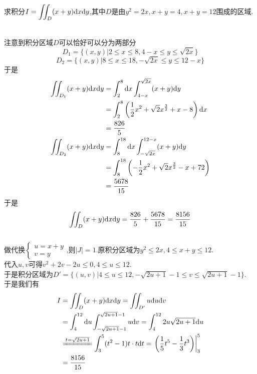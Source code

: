 \documentclass{ctexart}
\begin{document}
\begin{problem}[4.]
    求积分$\displaystyle I=\iint_{D}(x+y)\mathrm{d} x\mathrm{d} y$,其中$D$是由$y^2=2x,x+y=4,x+y=12$围成的区域.
\end{problem}
\begin{solution}
    \\
    注意到积分区域$D$可以恰好可以分为两部分
    \[D_1=\{(x,y)|2\leqslant x\leqslant8,4-x\leqslant y\leqslant\sqrt{2x}\}\]
    \[D_2=\{(x,y)|8\leqslant x\leqslant18,-\sqrt{2x}\leqslant y\leqslant 12-x\}\]
    于是
    \[\begin{aligned}
        \iint_{D_1}(x+y)\mathrm{d} x\mathrm{d} y
        &= \int_2^8\mathrm{d} x\int_{4-x}^{\sqrt{2x}}(x+y)\mathrm{d} y \\
        &= \int_2^8\left(\dfrac12x^2+\sqrt{2}x^{\frac32}+x-8\right)\mathrm{d} x \\
        &= \dfrac{826}{5}\\
        \iint_{D_2}(x+y)\mathrm{d} x\mathrm{d} y
        &= \int_8^{18}\mathrm{d} x\int_{-\sqrt{2x}}^{12-x}(x+y)\mathrm{d} y \\
        &= \int_8^{18}\left(-\dfrac12x^2+\sqrt2x^{\frac32}-x+72\right) \\
        &= \dfrac{5678}{15}
    \end{aligned}\]
    于是
    \[\iint_D(x+y)\mathrm{d} x\mathrm{d} y=\dfrac{826}{5}+\dfrac{5678}{15}=\dfrac{8156}{15}\]
    \\
    做代换$\left\{\begin{array}{l}
        u=x+y\\v=y
    \end{array}\right.$,则$|J|=1$.原积分区域为$y^2\leqslant2x,4\leqslant x+y\leqslant12$.\\
    代入$u,v$可得$v^2+2v-2u\leqslant0,4\leqslant u\leqslant12$.\\
    于是积分区域为$D'=\{(u,v)|4\leqslant u\leqslant12,-\sqrt{2u+1}-1\leqslant v\leqslant\sqrt{2u+1}-1\}$.\\
    于是我们有
    \[\begin{aligned}
        I
        &= \iint_D(x+y)\di x\di y = \iint_{D'}u\di u\di v \\
        &= \int_4^{12}\di u\int_{-\sqrt{2u+1}-1}^{\sqrt{2u+1}-1}u\di v = \int_{4}^{12}2u\sqrt{2u+1}\di u \\
        &\xlongequal{t=\sqrt{2u+1}}\int_3^5(t^2-1)t\cdot t\di t = \left.\left(\dfrac{1}{5}t^5-\dfrac13t^3\right)\right|_3^5 \\
        &= \dfrac{8156}{15} 
    \end{aligned}\]
\end{solution}
\end{document}

